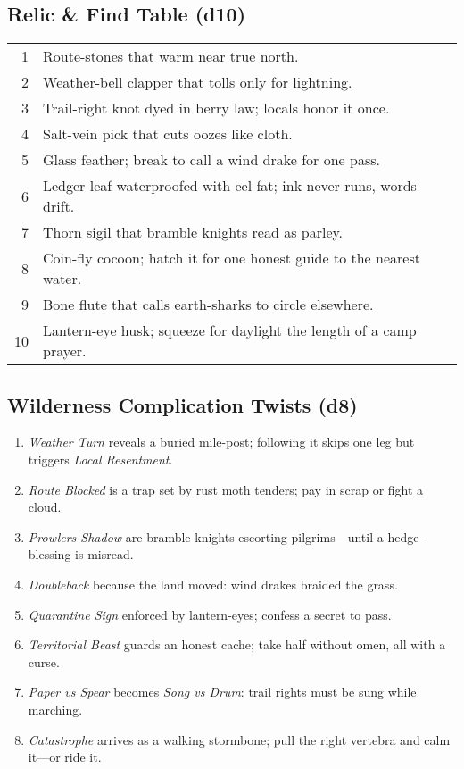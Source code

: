 \subsection*{Relic \& Find Table (d10)}
\begin{tabular}{r l}
1 & Route-stones that warm near true north. \\
2 & Weather-bell clapper that tolls only for lightning. \\
3 & Trail-right knot dyed in berry law; locals honor it once. \\
4 & Salt-vein pick that cuts oozes like cloth. \\
5 & Glass feather; break to call a wind drake for one pass. \\
6 & Ledger leaf waterproofed with eel-fat; ink never runs, words drift. \\
7 & Thorn sigil that bramble knights read as parley. \\
8 & Coin-fly cocoon; hatch it for one honest guide to the nearest water. \\
9 & Bone flute that calls earth-sharks to circle elsewhere. \\
10 & Lantern-eye husk; squeeze for daylight the length of a camp prayer. \\
\end{tabular}

\subsection*{Wilderness Complication Twists (d8)}
\begin{enumerate}
  \item \emph{Weather Turn} reveals a buried mile-post; following it skips one leg but triggers \emph{Local Resentment}.
  \item \emph{Route Blocked} is a trap set by rust moth tenders; pay in scrap or fight a cloud.
  \item \emph{Prowlers Shadow} are bramble knights escorting pilgrims—until a hedge-blessing is misread.
  \item \emph{Doubleback} because the land moved: wind drakes braided the grass.
  \item \emph{Quarantine Sign} enforced by lantern-eyes; confess a secret to pass.
  \item \emph{Territorial Beast} guards an honest cache; take half without omen, all with a curse.
  \item \emph{Paper vs Spear} becomes \emph{Song vs Drum}: trail rights must be sung while marching.
  \item \emph{Catastrophe} arrives as a walking stormbone; pull the right vertebra and calm it—or ride it.
\end{enumerate}

